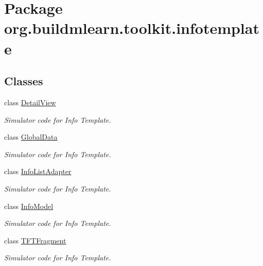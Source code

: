 \hypertarget{namespaceorg_1_1buildmlearn_1_1toolkit_1_1infotemplate}{\section{Package org.\-buildmlearn.\-toolkit.\-infotemplate}
\label{namespaceorg_1_1buildmlearn_1_1toolkit_1_1infotemplate}
}
\subsection*{Classes}
\begin{DoxyCompactItemize}
\item 
class \hyperlink{classorg_1_1buildmlearn_1_1toolkit_1_1infotemplate_1_1DetailView}{Detail\-View}
\begin{DoxyCompactList}\small\item\em Simulator code for Info Template. \end{DoxyCompactList}\item 
class \hyperlink{classorg_1_1buildmlearn_1_1toolkit_1_1infotemplate_1_1GlobalData}{Global\-Data}
\begin{DoxyCompactList}\small\item\em Simulator code for Info Template. \end{DoxyCompactList}\item 
class \hyperlink{classorg_1_1buildmlearn_1_1toolkit_1_1infotemplate_1_1InfoListAdapter}{Info\-List\-Adapter}
\begin{DoxyCompactList}\small\item\em Simulator code for Info Template. \end{DoxyCompactList}\item 
class \hyperlink{classorg_1_1buildmlearn_1_1toolkit_1_1infotemplate_1_1InfoModel}{Info\-Model}
\begin{DoxyCompactList}\small\item\em Simulator code for Info Template. \end{DoxyCompactList}\item 
class \hyperlink{classorg_1_1buildmlearn_1_1toolkit_1_1infotemplate_1_1TFTFragment}{T\-F\-T\-Fragment}
\begin{DoxyCompactList}\small\item\em Simulator code for Info Template. \end{DoxyCompactList}\end{DoxyCompactItemize}
